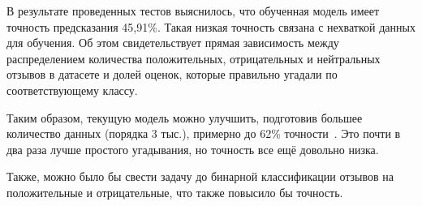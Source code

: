 \documentclass[a4paper,12pt]{article}
\begin{document}
	В результате проведенных тестов выяснилось, что обученная модель имеет точность предсказания 45,91\%. Такая низкая точность связана с нехваткой данных для обучения. Об этом свидетельствует прямая зависимость между распределением количества положительных, отрицательных и нейтральных отзывов в датасете и долей оценок, которые правильно угадали по соответствующему классу.
	
	Таким образом, текущую модель можно улучшить, подготовив большее количество данных (порядка 3 тыс.), примерно до 62\% точности~\cite{habr}. Это почти в два раза лучше простого угадывания, но точность все ещё довольно низка.
	
	Также, можно было бы свести задачу до бинарной классификации отзывов на положительные и отрицательные, что также повысило бы точность.
	
	
	
	\newpage
	
\end{document}
